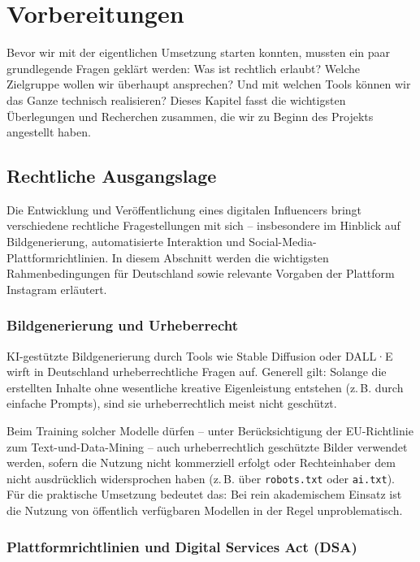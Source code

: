 \documentclass[a4paper,12pt]{article}
\begin{document}
\newpage

\section{Vorbereitungen}
Bevor wir mit der eigentlichen Umsetzung starten konnten, mussten ein paar grundlegende Fragen geklärt werden: Was ist rechtlich erlaubt? Welche Zielgruppe wollen wir überhaupt ansprechen? Und mit welchen Tools können wir das Ganze technisch realisieren? Dieses Kapitel fasst die wichtigsten Überlegungen und Recherchen zusammen, die wir zu Beginn des Projekts angestellt haben.

\subsection{Rechtliche Ausgangslage}

Die Entwicklung und Veröffentlichung eines digitalen Influencers bringt verschiedene rechtliche Fragestellungen mit sich – insbesondere im Hinblick auf Bildgenerierung, automatisierte Interaktion und Social-Media-Plattformrichtlinien. In diesem Abschnitt werden die wichtigsten Rahmenbedingungen für Deutschland sowie relevante Vorgaben der Plattform Instagram erläutert.

\subsubsection*{Bildgenerierung und Urheberrecht}

KI-gestützte Bildgenerierung durch Tools wie Stable Diffusion oder DALL·E wirft in Deutschland urheberrechtliche Fragen auf. Generell gilt: Solange die erstellten Inhalte ohne wesentliche kreative Eigenleistung entstehen (z.\,B. durch einfache Prompts), sind sie urheberrechtlich meist nicht geschützt. 

Beim Training solcher Modelle dürfen – unter Berücksichtigung der EU-Richtlinie zum Text-und-Data-Mining – auch urheberrechtlich geschützte Bilder verwendet werden, sofern die Nutzung nicht kommerziell erfolgt oder Rechteinhaber dem nicht ausdrücklich widersprochen haben (z.\,B. über \texttt{robots.txt} oder \texttt{ai.txt}). Für die praktische Umsetzung bedeutet das: Bei rein akademischem Einsatz ist die Nutzung von öffentlich verfügbaren Modellen in der Regel unproblematisch.

\subsubsection*{Plattformrichtlinien und Digital Services Act (DSA)}
\end{document}
